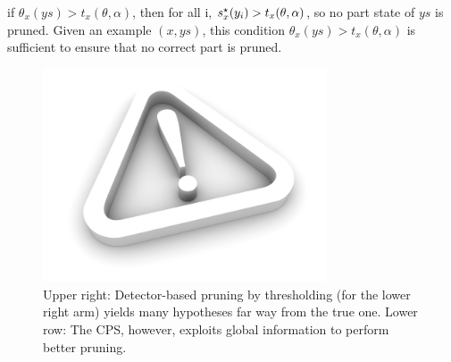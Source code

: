 if $\theta_x(ys) > t_x(\theta,\alpha)$, then for all i, $s^\star_x(y_i) >  t_x(\theta,\alpha)$, so no part state of $ys$ is pruned.   Given an example $(x,ys)$,
this condition $\theta_x(ys) > t_x(\theta,\alpha)$ is sufficient to ensure that no correct part is pruned.
\begin{figure}[t]
\begin{center}
\includegraphics[width=0.75\textwidth]{figs/empty.jpg}
\caption[SHORT TITLE]{Upper right: Detector-based pruning by thresholding (for 
the lower right arm) yields many hypotheses far way from the true one. Lower 
row: The CPS, however, exploits global information to perform better pruning.}
\label{fig:cascade_pruning}
\end{center}
\end{figure}

